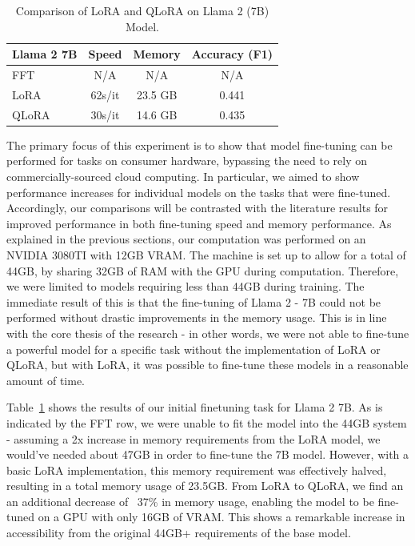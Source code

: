 \documentclass[11pt]{article}
\begin{document}
\begin{table}[h]
	\centering
	\caption{Comparison of LoRA and QLoRA on Llama 2 (7B) Model.}
	\label{tab:lora_qlora_comparison}
	\begin{tabular}{|l|c|c|c|}
		\hline
		\textbf{Llama 2 7B} & \textbf{Speed} & \textbf{Memory} & \textbf{Accuracy (F1)} \\ \hline
		FFT   & N/A      & N/A        & N/A        \\ \hline
		LoRA  & 62s/it   & 23.5 GB    & 0.441      \\ \hline
		QLoRA & 30s/it   & 14.6 GB    & 0.435      \\ \hline
	\end{tabular}
\end{table}

The primary focus of this experiment is to show that model fine-tuning can be performed for tasks on consumer hardware, bypassing the need to rely on commercially-sourced cloud computing. In particular, we aimed to show performance increases for individual models on the tasks that were fine-tuned. Accordingly, our comparisons will be contrasted with the literature results for improved performance in both fine-tuning speed and memory performance. 
As explained in the previous sections, our computation was performed on an NVIDIA 3080TI with 12GB VRAM. The machine is set up to allow for a total of 44GB, by sharing 32GB of RAM with the GPU during computation. Therefore, we were limited to models requiring less than 44GB during training. The immediate result of this is that the fine-tuning of Llama 2 - 7B could not be performed without drastic improvements in the memory usage. This is in line with the core thesis of the research - in other words, we were not able to fine-tune a powerful model for a specific task without the implementation of LoRA or QLoRA, but with LoRA, it was possible to fine-tune these models in a reasonable amount of time. 

Table~\ref{tab:lora_qlora_comparison} shows the results of our initial finetuning task for Llama 2 7B. As is indicated by the FFT row, we were unable to fit the model into the 44GB system - assuming a 2x increase in memory requirements from the LoRA model, we would’ve needed about 47GB in order to fine-tune the 7B model. However, with a basic LoRA implementation, this memory requirement was effectively halved, resulting in a total memory usage of 23.5GB. From LoRA to QLoRA, we find an an additional decrease of ~37\% in memory usage, enabling the model to be fine-tuned on a GPU with only 16GB of VRAM. This shows a remarkable increase in accessibility from the original 44GB+ requirements of the base model.
\end{document}
